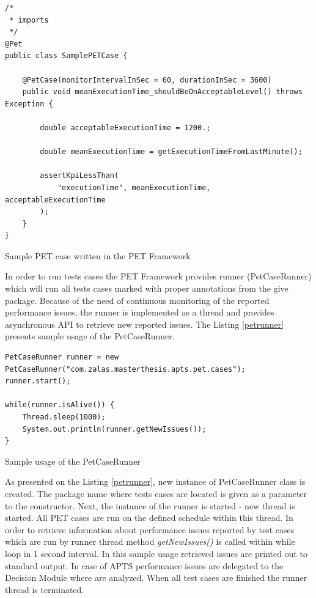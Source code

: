\documentclass[10pt,a4paper]{article}
\begin{document}
\begin{listing}[ht]\begin{verbatim}
/*
 * imports
 */
@Pet
public class SamplePETCase {

    @PetCase(monitorIntervalInSec = 60, durationInSec = 3600)
    public void meanExecutionTime_shouldBeOnAcceptableLevel() throws Exception {
        
        double acceptableExecutionTime = 1200.;
        
        double meanExecutionTime = getExecutionTimeFromLastMinute();
        
        assertKpiLessThan(
            "executionTime", meanExecutionTime, acceptableExecutionTime
        );
    }
}
\end{verbatim}
\caption{Sample PET case written in the PET Framework} \label{case}
\end{listing}

In order to run tests cases the PET Framework provides runner (PetCaseRunner) which will run all tests cases marked with proper annotations from the give package. Because of the need of continuous monitoring of the reported performance issues, the runner is implemented as a thread and provides asynchronous API to retrieve new reported issues. The Listing \ref{petrunner} presents sample usage of the PetCaseRunner. 

\begin{listing}[ht]\begin{verbatim}
PetCaseRunner runner = new PetCaseRunner("com.zalas.masterthesis.apts.pet.cases");
runner.start();

while(runner.isAlive()) {
    Thread.sleep(1000);
    System.out.println(runner.getNewIssues());
}
\end{verbatim}
\caption{Sample usage of the PetCaseRunner} \label{petrunner}
\end{listing}

As presented on the Listing \ref{petrunner}, new instance of PetCaseRunner class is created. The package name where tests cases are located is given as a parameter to the constructor. Next, the instance of the runner is started - new thread is started. All PET cases are run on the defined schedule within this thread. In order to retrieve information about performance issues reported by test cases which are run by runner thread method \textit{getNewIssues()} is called within while loop in 1 second interval. In this sample usage retrieved issues are printed out to standard output. In case of APTS performance issues are delegated to the Decision Module where are analyzed. When all test cases are finished the runner thread is terminated.    
\end{document}
